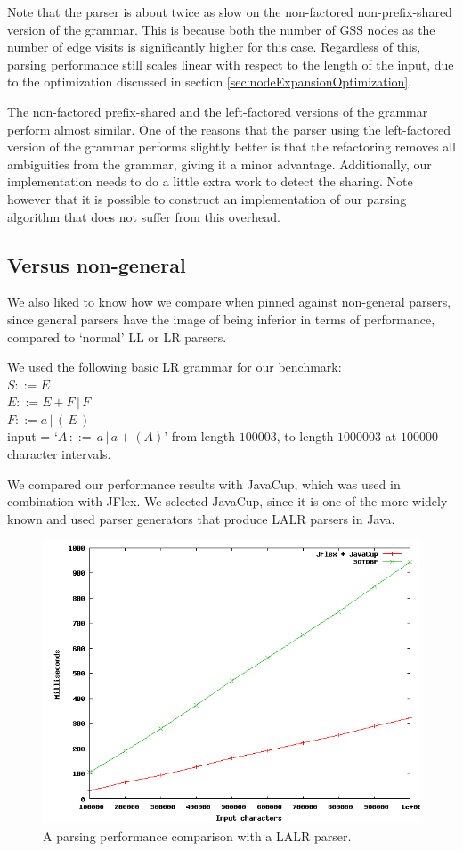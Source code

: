 \documentclass[a4paper,10pt]{article}
\begin{document}
Note that the parser is about twice as slow on the non-factored non-prefix-shared version of the grammar. This is because both the number of GSS nodes as the number of edge visits is significantly higher for this case. Regardless of this, parsing performance still scales linear with respect to the length of the input, due to the optimization discussed in section \ref{sec:nodeExpansionOptimization}.

The non-factored prefix-shared and the left-factored versions of the grammar perform almost similar. One of the reasons that the parser using the left-factored version of the grammar performs slightly better is that the refactoring removes all ambiguities from the grammar, giving it a minor advantage. Additionally, our implementation needs to do a little extra work to detect the sharing. Note however that it is possible to construct an implementation of our parsing algorithm that does not suffer from this overhead.

\subsection{Versus non-general}

We also liked to know how we compare when pinned against non-general parsers, since general parsers have the image of being inferior in terms of performance, compared to `normal' LL or LR parsers.

We used the following basic LR grammar for our benchmark:\\
$S ::= E$\\
$E ::= E + F\,|\,F$\\
$F ::= a\,|\,(\,E\,)$\\
input = `$A\,::=\,a\,|\,a+(A)$' from length $100003$, to length $1000003$ at $100000$ character intervals.

We compared our performance results with JavaCup, which was used in combination with JFlex. We selected JavaCup, since it is one of the more widely known and used parser generators that produce LALR parsers in Java.

\begin{figure}[H]
\centering
\includegraphics[scale=0.5]{vsLALR.png}
\caption{A parsing performance comparison with a LALR parser.}
\end{figure}
\end{document}
